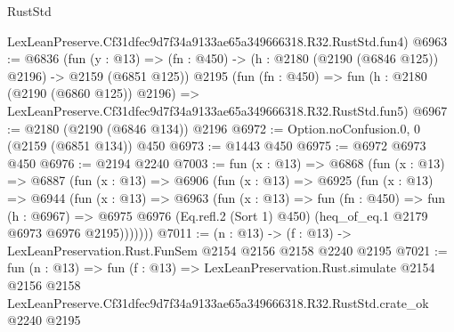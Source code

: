 \begin{lexlean}{RustStd}
\begin{coremodule}
    LexLeanPreserve.Cf31dfec9d7f34a9133ae65a349666318.R32.RustStd.fun4)
@6963 := @6836
    (fun (y : @13) => (fn : @450) -> (h : @2180 (@2190 (@6846 @125)) @2196) -> @2159 (@6851 @125))
    @2195
    (fun (fn : @450) =>
    fun (h : @2180 (@2190 (@6860 @125)) @2196) =>
    LexLeanPreserve.Cf31dfec9d7f34a9133ae65a349666318.R32.RustStd.fun5)
@6967 := @2180 (@2190 (@6846 @134)) @2196
@6972 := Option.noConfusion.{0, 0} (@2159 (@6851 @134)) @450
@6973 := @1443 @450
@6975 := @6972 @6973 @450
@6976 := @2194 @2240
@7003 := fun (x : @13) =>
  @6868
    (fun (x : @13) =>
    @6887
      (fun (x : @13) =>
      @6906
        (fun (x : @13) =>
        @6925
          (fun (x : @13) =>
          @6944
            (fun (x : @13) =>
            @6963
              (fun (x : @13) =>
              fun (fn : @450) =>
              fun (h : @6967) =>
              @6975 @6976 (Eq.refl.{2} (Sort 1) @450) (heq_of_eq.{1} @2179 @6973 @6976 @2195)))))))
@7011 := (n : @13) -> (f : @13) -> LexLeanPreservation.Rust.FunSem @2154 @2156 @2158 @2240 @2195
@7021 := fun (n : @13) =>
  fun (f : @13) =>
  LexLeanPreservation.Rust.simulate
    @2154
    @2156
    @2158
    LexLeanPreserve.Cf31dfec9d7f34a9133ae65a349666318.R32.RustStd.crate_ok
    @2240
    @2195
\end{coremodule}
\end{lexlean}
